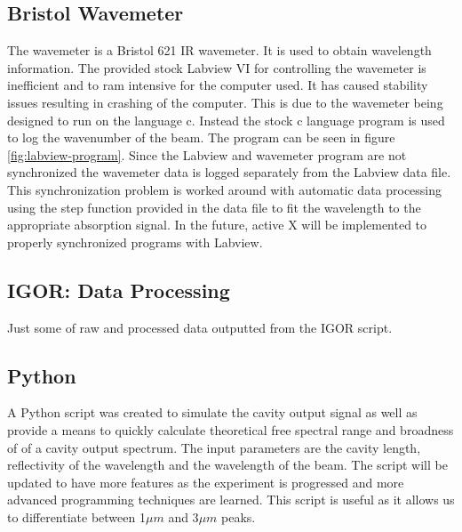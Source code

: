 \documentclass[11pt,a4paper]{book}
\newcommand{\imginput}[1]{} %
\begin{document}
		\subsection{Bristol Wavemeter}
			The wavemeter is a Bristol 621 IR wavemeter. It is used to obtain wavelength information. The provided stock Labview VI for controlling the wavemeter is inefficient and to ram intensive for the computer used. It has caused stability issues resulting in crashing of the computer. This is due to the wavemeter being designed to run on the language c. Instead the stock c language program is used to log the wavenumber of the beam. The program can be seen in figure \autoref{fig:labview-program}. Since the Labview and wavemeter program are not synchronized the wavemeter data is logged separately from the Labview data file. This synchronization problem is worked around with automatic data processing using the step function provided in the data file to fit the wavelength to the appropriate absorption signal. In the future, active X will be implemented to properly synchronized programs with Labview.
			
			\subsection{IGOR: Data Processing}
			
			Just some of raw and processed data outputted from the IGOR script.
			
			\begin{figure} [!ht]
				\centering
				\resizebox{160mm}{!}{\imginput{images/igor-process.pdf_tex}}
				\caption{}
				\label{fig:igor-process}
				
			\end{figure}
			
		\subsection{Python}
			A Python script was created to simulate the cavity output signal as well as provide a means to quickly calculate theoretical free spectral range and broadness of of a cavity output spectrum. The input parameters are the cavity length, reflectivity of the wavelength and the wavelength of the beam. The script will be updated to have more features as the experiment is progressed and more advanced programming techniques are learned. This script is useful as it allows us to differentiate between 1$\mu m$ and 3$\mu m$ peaks.
			
\end{document}
